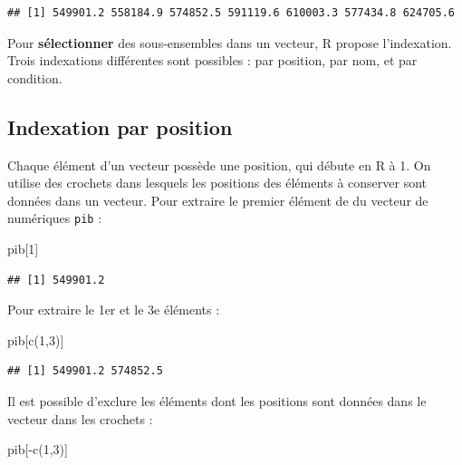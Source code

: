 \documentclass[
  11pt,
]{book}
\newenvironment{Shaded}{\begin{snugshade}}{\end{snugshade}}
\newcommand{\DecValTok}[1]{\textcolor[rgb]{0.00,0.00,0.81}{#1}}
\newcommand{\FunctionTok}[1]{\textcolor[rgb]{0.00,0.00,0.00}{#1}}
\newcommand{\NormalTok}[1]{#1}
\newcommand{\SpecialCharTok}[1]{\textcolor[rgb]{0.00,0.00,0.00}{#1}}
\numberwithin{equation}{section}
\numberwithin{countremarque}{section}
\begin{document}
\begin{lstlisting}
## [1] 549901.2 558184.9 574852.5 591119.6 610003.3 577434.8 624705.6
\end{lstlisting}

Pour \textbf{sélectionner} des sous-ensembles dans un vecteur, R propose l'indexation. Trois indexations différentes sont possibles : par position, par nom, et par condition.

\hypertarget{indexation-par-position}{%
\subsection{Indexation par position}\label{indexation-par-position}}

Chaque élément d'un vecteur possède une position, qui débute en R à 1. On utilise des crochets dans lesquels les positions des éléments à conserver sont données dans un vecteur. Pour extraire le premier élément de du vecteur de numériques \texttt{pib} :

\begin{Shaded}
\begin{Highlighting}[]
\NormalTok{pib[}\DecValTok{1}\NormalTok{]}
\end{Highlighting}
\end{Shaded}

\begin{lstlisting}
## [1] 549901.2
\end{lstlisting}

Pour extraire le 1er et le 3e éléments :

\begin{Shaded}
\begin{Highlighting}[]
\NormalTok{pib[}\FunctionTok{c}\NormalTok{(}\DecValTok{1}\NormalTok{,}\DecValTok{3}\NormalTok{)]}
\end{Highlighting}
\end{Shaded}

\begin{lstlisting}
## [1] 549901.2 574852.5
\end{lstlisting}

Il est possible d'exclure les éléments dont les positions sont données dans le vecteur dans les crochets :

\begin{Shaded}
\begin{Highlighting}[]
\NormalTok{pib[}\SpecialCharTok{{-}}\FunctionTok{c}\NormalTok{(}\DecValTok{1}\NormalTok{,}\DecValTok{3}\NormalTok{)]}
\end{Highlighting}
\end{Shaded}
\end{document}
